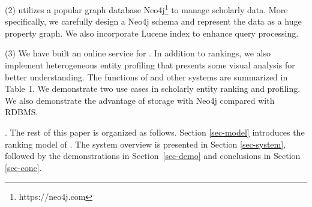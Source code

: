 
\noindent (2) \oursystem utilizes a popular graph database Neo4j\footnote{https://neo4j.com} to manage scholarly data. More specifically, we carefully design a Neo4j schema and represent the data as a huge property graph. We also incorporate Lucene index to enhance query processing.


\noindent (3) We have built an online service for \oursystem. In addition to rankings, we also implement heterogeneous entity profiling that presents some visual analysis for better understanding. The functions of \oursystem and other systems are summarized in Table~I. We demonstrate two use cases in scholarly entity ranking and profiling. We also demonstrate the advantage of storage with Neo4j compared with RDBMS.



.
The rest of this paper is organized as follows. Section \ref{sec-model} introduces the ranking model of \oursystem. The system overview is presented in Section \ref{sec-system}, followed by the demonstrations in Section~\ref{sec-demo} and conclusions in Section \ref{sec-conc}.

